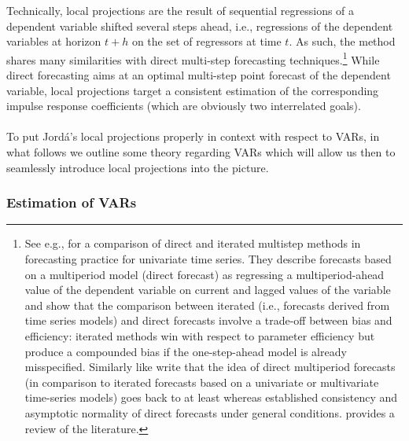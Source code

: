 \documentclass[a4paper,11pt,listof=nochaptergap,oneside,pointednumbers,bibtotoc,bigheadings,liststotoc]{scrbook}
\theoremstyle{mysatz}
\theoremstyle{mydefinition}
\theoremstyle{mybemerkung}
\renewcommand*{\paragraph}[1]{\subsubsection*{#1} \vspace{-3mm}} %
\begin{document}
\begin{itemize}
Technically, local projections are the result of sequential regressions of a dependent variable shifted several steps ahead, i.e., regressions of the dependent variables at horizon $t+h$ on the set of regressors at time $t$. As such, the method shares many similarities with direct multi-step forecasting techniques.\footnote{See e.g., \citet{marcellinoetal:06} for a comparison of direct and iterated multistep methods in forecasting practice for univariate time series. They describe forecasts based on a multiperiod model (direct forecast) as regressing a multiperiod-ahead value of the dependent variable on current and lagged values of the variable and show that the comparison between iterated (i.e., forecasts derived from time series models) and direct forecasts involve a trade-off between bias and efficiency: iterated methods win with respect to parameter efficiency but produce a compounded bias if the one-step-ahead model is already misspecified. Similarly like \citet{jorda:05} write that the idea of direct multiperiod forecasts (in comparison to iterated forecasts based on a univariate or multivariate time-series models) goes back to at least \citet{cox:61} whereas \citet{weiss:91} established consistency and asymptotic normality of direct forecasts under general conditions. \citet{bhansali:02} provides a review of the literature.} While direct forecasting aims at an optimal multi-step point forecast of the dependent variable, local projections target a consistent estimation of the corresponding impulse response coefficients (which are obviously two interrelated goals).\\
\\
To put Jordá's local projections properly in context with respect to VARs, in what follows we outline some theory regarding VARs which will allow us then to seamlessly introduce local projections into the picture.
\end{itemize}
\endgroup









\paragraph{Estimation of VARs}
\end{document}
